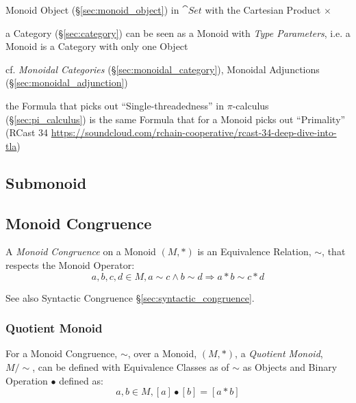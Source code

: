 Monoid Object (\S\ref{sec:monoid_object}) in $\cat{Set}$ with the
Cartesian Product $\times$

a Category (\S\ref{sec:category}) can be seen as a Monoid with \emph{Type
  Parameters}, i.e. a Monoid is a Category with only one Object

\fist cf. \emph{Monoidal Categories} (\S\ref{sec:monoidal_category}),
Monoidal Adjunctions (\S\ref{sec:monoidal_adjunction})

the Formula that picks out ``Single-threadedness'' in $\pi$-calculus
(\S\ref{sec:pi_calculus}) is the same Formula that for a Monoid picks out
``Primality'' (RCast 34
\url{https://soundcloud.com/rchain-cooperative/rcast-34-deep-dive-into-tla})



\subsection{Submonoid}\label{sec:submonoid}

\subsection{Monoid Congruence}\label{sec:monoid_congruence}

A \emph{Monoid Congruence} on a Monoid $(M,*)$ is an Equivalence
Relation, $\sim$, that respects the Monoid Operator:
\[
  a,b,c,d \in M, a \sim c \wedge b \sim d \Rightarrow a*b \sim c*d
\]

See also Syntactic Congruence \S\ref{sec:syntactic_congruence}.



\subsubsection{Quotient Monoid}\label{sec:quotient_monoid}

For a Monoid Congruence, $\sim$, over a Monoid, $(M,*)$, a
\emph{Quotient Monoid}, $M/\sim$, can be defined with Equivalence
Classes as of $\sim$ as Objects and Binary Operation $\bullet$ defined
as:
\[
  a,b \in M, [a]\bullet[b] = [a*b]
\]




